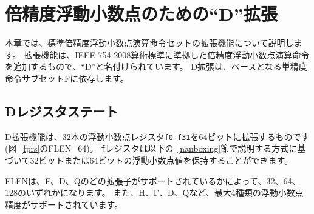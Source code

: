 \begin{comment}
\chapter{``D'' Standard Extension for Double-Precision Floating-Point,
Version 2.2}
\end{comment}
\chapter{倍精度浮動小数点のための``D''拡張}

\begin{comment}
This chapter describes the standard double-precision floating-point
instruction-set extension, which is named ``D'' and adds
double-precision floating-point computational instructions compliant
with the IEEE 754-2008 arithmetic standard.  The D extension depends on
the base single-precision instruction subset F.
\end{comment}

本章では、標準倍精度浮動小数点演算命令セットの拡張機能について説明します。
拡張機能は、IEEE 754-2008算術標準に準拠した倍精度浮動小数点演算命令を追加するもので、``D''と名付けられています。 
D拡張は、ベースとなる単精度命令サブセットFに依存します。

\begin{comment}
\section{D Register State}
\end{comment}
\section{Dレジスタステート}

\begin{comment}
The D extension widens the 32 floating-point registers, {\tt f0}--{\tt
  f31}, to 64 bits (FLEN=64 in Figure~\ref{fprs}).  The {\tt f}
registers can now hold either 32-bit or 64-bit floating-point values
as described below in Section~\ref{nanboxing}.
\end{comment}

D拡張機能は、32本の浮動小数点レジスタ{\tt f0}--{\tt f31}を64ビットに拡張するものです(図~\ref{fprs}のFLEN=64)。 
{\tt f}レジスタは以下の~\ref{nanboxing}節で説明する方式に基づいて32ビットまたは64ビットの浮動小数点値を保持することができます。

\begin{commentary}
\begin{comment}
FLEN can be 32, 64, or 128 depending on which of the F, D, and Q
extensions are supported.  There can be up to four different
floating-point precisions supported, including H, F, D, and Q.
\end{comment}
FLENは、F、D、Qのどの拡張子がサポートされているかによって、32、64、128のいずれかになります。
また、H、F、D、Qなど、最大4種類の浮動小数点精度がサポートされています。
\end{commentary}

